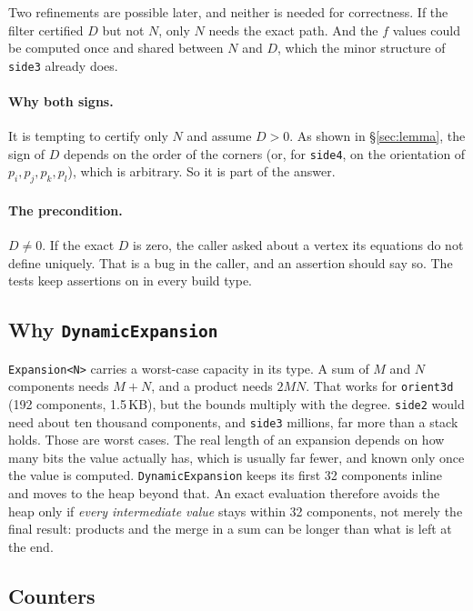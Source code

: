 \documentclass[11pt,a4paper]{article}
\newcommand{\code}[1]{\texttt{#1}}
\newcommand{\secref}[1]{\S\ref{#1}}
\theoremstyle{remark}
\begin{document}
Two refinements are possible later, and neither is needed for correctness. If the filter
certified $D$ but not $N$, only $N$ needs the exact path. And the $f$ values could be computed
once and shared between $N$ and $D$, which the minor structure of \code{side3} already does.

\paragraph{Why both signs.} It is tempting to certify only $N$ and assume $D > 0$. As shown in
\secref{sec:lemma}, the sign of $D$ depends on the order of the corners (or, for \code{side4},
on the orientation of $p_i, p_j, p_k, p_l$), which is arbitrary. So it is part of the answer.

\paragraph{The precondition.} $D \neq 0$. If the exact $D$ is zero, the caller asked about a
vertex its equations do not define uniquely. That is a bug in the caller, and an assertion should say so. The
tests keep assertions on in every build type.

\subsection{Why \texorpdfstring{\code{DynamicExpansion}}{DynamicExpansion}}

\code{Expansion<N>} carries a worst-case capacity in its type. A sum of $M$ and $N$ components
needs $M+N$, and a product needs $2MN$. That works for \code{orient3d} (192 components, 1.5\,KB),
but the bounds multiply with the degree. \code{side2} would need about ten thousand components,
and \code{side3} millions, far more than a stack holds. Those are worst cases. The real length of
an expansion depends on how many bits the value actually has, which is usually far fewer, and
known only once the value is computed. \code{DynamicExpansion} keeps its first 32 components
inline and moves to the heap beyond that. An exact evaluation therefore avoids the heap only if
\emph{every intermediate value} stays within 32 components, not merely the final result:
products and the merge in a sum can be longer than what is left at the end.

\subsection{Counters}
\end{document}
